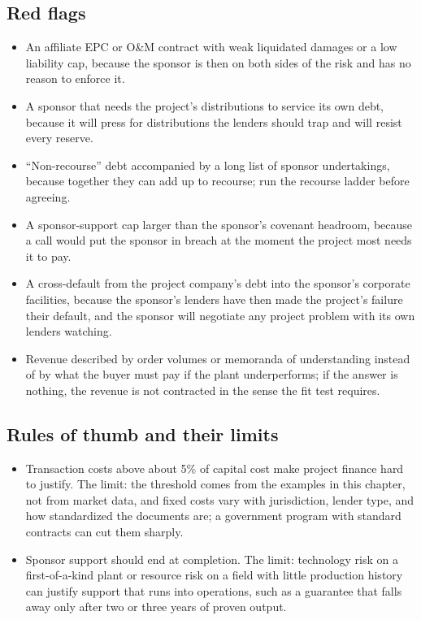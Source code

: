 \subsection*{Red flags}
\begin{itemize}
\item An affiliate EPC or O\&M contract with weak liquidated damages or a low liability cap, because the sponsor is then on both sides of the risk and has no reason to enforce it.
\item A sponsor that needs the project's distributions to service its own debt, because it will press for distributions the lenders should trap and will resist every reserve.
\item ``Non-recourse'' debt accompanied by a long list of sponsor undertakings, because together they can add up to recourse; run the recourse ladder before agreeing.
\item A sponsor-support cap larger than the sponsor's covenant headroom, because a call would put the sponsor in breach at the moment the project most needs it to pay.
\item A cross-default from the project company's debt into the sponsor's corporate facilities, because the sponsor's lenders have then made the project's failure their default, and the sponsor will negotiate any project problem with its own lenders watching.
\item Revenue described by order volumes or memoranda of understanding instead of by what the buyer must pay if the plant underperforms; if the answer is nothing, the revenue is not contracted in the sense the fit test requires.
\end{itemize}

\subsection*{Rules of thumb and their limits}
\begin{itemize}
\item Transaction costs above about 5\% of capital cost make project finance hard to justify. The limit: the threshold comes from the examples in this chapter, not from market data, and fixed costs vary with jurisdiction, lender type, and how standardized the documents are; a government program with standard contracts can cut them sharply.
\item Sponsor support should end at completion. The limit: technology risk on a first-of-a-kind plant or resource risk on a field with little production history can justify support that runs into operations, such as a guarantee that falls away only after two or three years of proven output.
\end{itemize}

